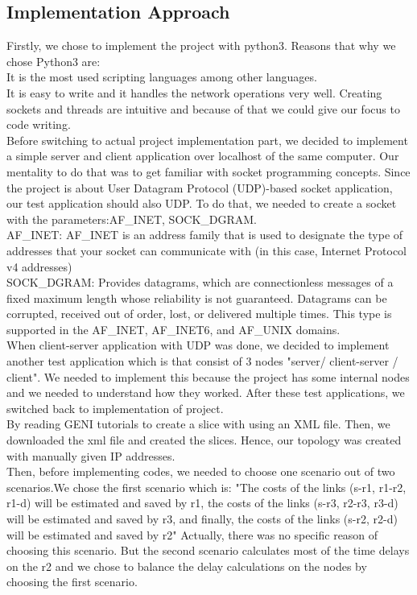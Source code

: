 \documentclass[conference]{IEEEtran}
\begin{document}
\subsection{Implementation Approach}
Firstly, we chose to implement the project with python3. Reasons that why we chose Python3 are: \\
It is the most used scripting languages among other languages. \\
It is easy to write and it handles the network operations very well.
Creating sockets and threads are intuitive and because of that we could give our focus to code writing. \\
Before switching to actual project implementation part, we decided to implement a simple server and client application over localhost of the same computer. Our mentality to do that was to get familiar with socket programming concepts. Since the project is about User Datagram Protocol (UDP)-based socket application, our test application should also UDP. To do that, we needed to create a socket with the parameters:AF\_INET, SOCK\_DGRAM. \\
AF\_INET: AF\_INET is an address family that is used to designate the type of addresses that your socket can communicate with (in this case, Internet Protocol v4 addresses) \cite{b1}\\
SOCK\_DGRAM: Provides datagrams, which are connectionless messages of a fixed maximum length whose reliability is not guaranteed. Datagrams can be corrupted, received out of order, lost, or delivered multiple times. This type is supported in the AF\_INET, AF\_INET6, and AF\_UNIX domains.\cite{b2}\\
When client-server application with UDP was done, we decided to implement another test application which is that consist of 3 nodes "server/ client-server / client". We needed to implement this because the project has some internal nodes and we needed to understand how they worked. After these test applications, we switched back to implementation of project. \\
By reading GENI tutorials to create a slice with using an XML file. Then, we downloaded the xml file and created the slices. Hence, our topology was created with manually given IP addresses. \\
Then, before implementing codes, we needed to choose one scenario out of two scenarios.We chose the first scenario which is:
"The costs of the links (s-r1, r1-r2, r1-d) will be estimated and saved by r1,  the costs of the links (s-r3, r2-r3, r3-d) will be estimated and saved by r3, and finally, the costs of the links (s-r2, r2-d) will be estimated and saved by r2"
Actually, there was no specific reason of choosing this scenario. But the second scenario calculates most of the time delays on the r2 and we chose to balance the delay calculations on the nodes by choosing the first scenario.
\end{document}
